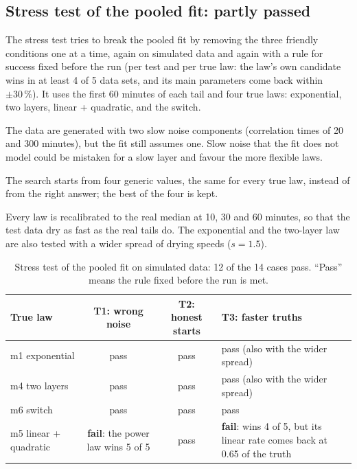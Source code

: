 \documentclass[11pt,a4paper]{article}
\begin{document}
\subsection{Stress test of the pooled fit: partly passed}
\label{sec:stress}

The stress test tries to break the pooled fit by removing the three friendly conditions one at a time, again on
simulated data and again with a rule for success fixed before the run (per test and per true law: the law's own
candidate wins in at least 4 of 5 data sets, and its main parameters come back within $\pm 30\,\%$). It uses the first
60 minutes of each tail and four true laws: exponential, two layers, linear + quadratic, and the switch.
\begin{description}[leftmargin=1.2cm, style=nextline]
\item[T1, wrong noise model.] The data are generated with two slow noise components (correlation times of 20 and 300
minutes), but the fit still assumes one. Slow noise that the fit does not model could be mistaken for a slow layer and
favour the more flexible laws.
\item[T2, honest starting points.] The search starts from four generic values, the same for every true law, instead
of from the right answer; the best of the four is kept.
\item[T3, faster truths.] Every law is recalibrated to the real median at 10, 30 and 60 minutes, so that the test
data dry as fast as the real tails do. The exponential and the two-layer law are also tested with a wider spread of
drying speeds ($s = 1.5$).
\end{description}

\begin{table}[H]
\centering
\caption{Stress test of the pooled fit on simulated data: 12 of the 14 cases pass. ``Pass'' means the rule fixed before
the run is met.}
\label{tab:stress}
\small
\begin{tabularx}{\linewidth}{@{}l c c Y@{}}
\toprule
True law & T1: wrong noise & T2: honest starts & T3: faster truths \\
\midrule
m1 exponential & pass & pass & pass (also with the wider spread) \\
m4 two layers & pass & pass & pass (also with the wider spread) \\
m6 switch & pass & pass & pass \\
m5 linear + quadratic & \textbf{fail}: the power law wins 5 of 5 & pass & \textbf{fail}: wins 4 of 5, but its linear rate comes back at 0.65 of the truth \\
\bottomrule
\end{tabularx}
\end{table}
\end{document}
